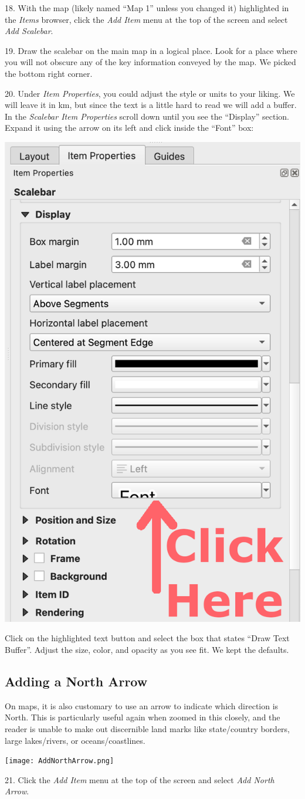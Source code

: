 \documentclass[oneside,a4paper,11pt,explicit]{book}
\begin{document}
18. With the map (likely named ``Map 1'' unless you changed it) highlighted in the \textit{Items} browser, click the \textit{Add Item} menu at the top of the screen and select \textit{Add Scalebar}.

19. Draw the scalebar on the main map in a logical place. Look for a place where you will not obscure any of the key information conveyed by the map. We picked the bottom right corner.

20. Under \textit{Item Properties}, you could adjust the style or units to your liking. We will leave it in km, but since the text is a little hard to read we will add a buffer. In the \textit{Scalebar Item Properties} scroll down until you see the ``Display'' section. Expand it using the arrow on its left and click inside the ``Font'' box:

\vspace{.25em}

\centerline{\includegraphics[width=.24\textwidth]{AdjustScalebar.png}}

Click on the highlighted text button and select the box that states ``Draw Text Buffer''. Adjust the size, color, and opacity as you see fit. We kept the defaults. 

\subsection{Adding a North Arrow}

On maps, it is also customary to use an arrow to indicate which direction is North. This is particularly useful again when zoomed in this closely, and the reader is unable to make out discernible land marks like state/country borders, large lakes/rivers, or oceans/coastlines. 

\vspace{.25em}

\centerline{\texttt{[image: AddNorthArrow.png]}}

21. Click the \textit{Add Item} menu at the top of the screen and select \textit{Add North Arrow}.
\end{document}
